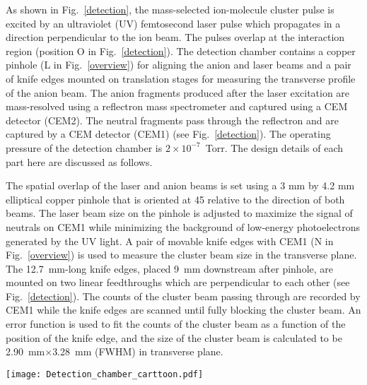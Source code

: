 \documentclass[%
aip,
rsi,
 amsmath,amssymb,
reprint,%
]{revtex4-1}
\begin{document}
As shown in Fig.~\ref{detection}, the mass-selected ion-molecule cluster pulse is excited by an ultraviolet (UV) femtosecond laser pulse which propagates in a direction perpendicular to the ion beam. The pulses overlap at the interaction region (position O in Fig.~\ref{detection}). The detection chamber contains a copper pinhole (L in Fig.~\ref{overview}) for aligning the anion and laser beams and a pair of knife edges mounted on translation stages for measuring the transverse profile of the anion beam. The anion fragments produced after the laser excitation are mass-resolved using a reflectron mass spectrometer and captured using a CEM detector (CEM2). The neutral fragments pass through the reflectron and are captured by a CEM detector (CEM1) (see Fig.~\ref{detection}). The operating pressure of the detection chamber is $2\times10^{-7}$~Torr. The design details of each part here are discussed as follows.

The spatial overlap of the laser and anion beams is set using a 3 mm by 4.2 mm elliptical copper pinhole that is oriented at 45{\textdegree} relative to the direction of both beams. The laser beam size on the pinhole is adjusted to maximize the signal of neutrals on CEM1 while minimizing the background of low-energy photoelectrons generated by the UV light. A pair of movable knife edges with CEM1 (N in Fig.~\ref{overview}) is used to measure the cluster beam size in the transverse plane. The 12.7~mm-long knife edges, placed 9~mm downstream after pinhole, are mounted on two linear feedthroughs which are perpendicular to each other (see Fig.~\ref{detection}). The counts of the cluster beam passing through are recorded by CEM1 while the knife edges are scanned until fully blocking the cluster beam. An error function is used to fit the counts of the cluster beam as a function of the position of the knife edge, and the size of the cluster beam is calculated to be 2.90~mm$\times$3.28~mm (FWHM) in transverse plane.

\begin{figure*}
\centering
\texttt{[image: Detection\_chamber\_carttoon.pdf]}
\caption{Top view diagram of the detection chamber. The mass-selected parent ion-molecule cluster (red) is crossed by the UV beam (purple) at position O, marked as "laser-anion interaction". Anion fragments (golden) and the parent anion (red) are reversed by reflectron and hit detector CEM2 at position B. Neutrals(green) pass through the reflectron and hit detector CEM1 at position A. The parent anion has higher kinetic energy and hits upper detection area of CEM2. Anion fragments have lower energy and hit the lower detection area of CEM2. The dashed black lines of the reflectron indicates the high-transparency conductive meshes. }
\label{detection}
\end{figure*}     
\end{document}
